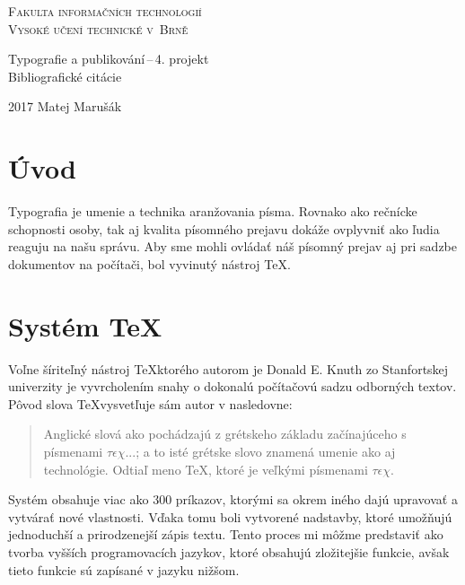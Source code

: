 \documentclass[a4paper, 11pt] {article}
\begin{document}
\begin{titlepage}
\begin{center}

\newtheorem{definicia}{Definice}[section]
\newtheorem{algoritmus}[definicia]{Algoritmus}
\newtheorem{veta}{Věta}



{\Huge \textsc{Fakulta informačních technologií\\
Vysoké učení technické v~Brně}}\\


{\LARGE
	Typografie a publikování\,--\,4. projekt\\
	Bibliografické citácie\\
}

\end{center}

{\LARGE 2017    \hfill     Matej Marušák}
\end{titlepage}

\section{Úvod}
Typografia je umenie a technika aranžovania písma. Rovnako ako rečnícke schopnosti osoby, tak aj kvalita písomného prejavu dokáže ovplyvniť ako ľudia reaguju na našu správu\cite{pow_typo}. Aby sme mohli ovládať náš písomný prejav aj pri sadzbe dokumentov na počítači, bol vyvinutý nástroj \TeX.

\section{Systém \TeX}
Voľne šíriteľný nástroj \TeX ktorého autorom je Donald E. Knuth zo Stanfortskej univerzity je vyvrcholením snahy o dokonalú počítačovú sadzu odborných textov. Pôvod slova \TeX vysvetľuje sám autor v \cite{knuth} nasledovne:
\begin{quotation}

Anglické slová ako  pochádzajú z grétskeho základu začínajúceho s písmenami $\tau\epsilon\chi...$; a to isté grétske slovo znamená umenie ako aj technológie. Odtiaľ meno \TeX, ktoré je veľkými písmenami  $\tau\epsilon\chi$.
\end{quotation}

Systém obsahuje viac ako 300 príkazov, ktorými sa okrem iného dajú upravovať a vytvárať nové vlastnosti. Vďaka tomu boli vytvorené nadstavby, ktoré umožňujú jednoduchší a prirodzenejší zápis textu. Tento proces mi môžme predstaviť ako tvorba vyšších programovacích jazykov, ktoré obsahujú zložitejšie funkcie, avšak tieto funkcie sú zapísané v jazyku nižšom\cite{rybicka}.
\end{document}
